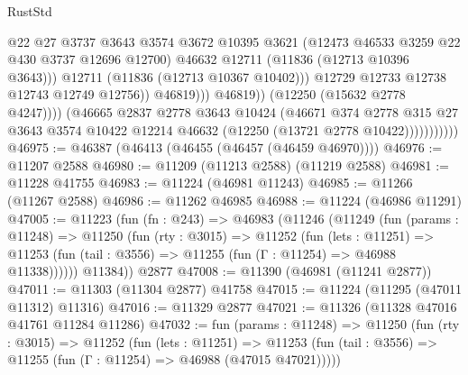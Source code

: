 \begin{lexlean}{RustStd}
\begin{coremodule}
                                        @22
                                        @27
                                        @3737
                                        @3643
                                        @3574
                                        @3672
                                        @10395
                                        @3621
                                        (@12473 @46533 @3259 @22 @430 @3737 @12696 @12700)
                                        @46632
                                        @12711
                                        (@11836 (@12713 @10396 @3643)))
                                      @12711
                                      (@11836 (@12713 @10367 @10402)))
                                    @12729
                                    @12733
                                    @12738
                                    @12743
                                    @12749
                                    @12756))
                                @46819)))
                          @46819))
                      (@12250 (@15632 @2778 @4247))))
                  (@46665
                    @2837
                    @2778
                    @3643
                    @10424
                    (@46671
                      @374
                      @2778
                      @315
                      @27
                      @3643
                      @3574
                      @10422
                      @12214
                      @46632
                      (@12250 (@13721 @2778 @10422)))))))))))
@46975 := @46387 (@46413 (@46455 (@46457 (@46459 @46970))))
@46976 := @11207 @2588
@46980 := @11209 (@11213 @2588) (@11219 @2588)
@46981 := @11228 @41755
@46983 := @11224 (@46981 @11243)
@46985 := @11266 (@11267 @2588)
@46986 := @11262 @46985
@46988 := @11224 (@46986 @11291)
@47005 := @11223
    (fun (fn : @243) =>
    @46983
      (@11246
        (@11249
          (fun (params : @11248) =>
          @11250
            (fun (rty : @3015) =>
            @11252
              (fun (lets : @11251) =>
              @11253 (fun (tail : @3556) => @11255 (fun (Γ : @11254) => @46988 @11338))))))
        @11384))
    @2877
@47008 := @11390 (@46981 (@11241 @2877))
@47011 := @11303 (@11304 @2877) @41758
@47015 := @11224 (@11295 (@47011 @11312) @11316)
@47016 := @11329 @2877
@47021 := @11326 (@11328 @47016 @41761 @11284 @11286)
@47032 := fun (params : @11248) =>
  @11250
    (fun (rty : @3015) =>
    @11252
      (fun (lets : @11251) =>
      @11253 (fun (tail : @3556) => @11255 (fun (Γ : @11254) => @46988 (@47015 @47021)))))

\end{coremodule}
\end{lexlean}
